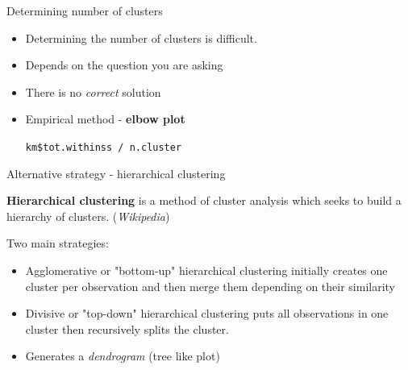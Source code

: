 \documentclass[9pt]{beamer}
\begin{document}
\begin{frame}
{Determining number of clusters}
\begin{itemize}
\item Determining the number of clusters is difficult.
\item Depends on the question you are asking
\item There is no \textit{correct} solution
\pause
\item Empirical method - \textbf{elbow plot}
\begin{codebox}
\texttt{km\$tot.withinss / n.cluster}
\end{codebox}
\end{itemize}
\end{frame}

\begin{frame}
{Alternative strategy - hierarchical clustering}

\textbf{Hierarchical clustering} is a method of cluster analysis which seeks to build a hierarchy of clusters. (\textit{Wikipedia})

Two main strategies:
\begin{itemize}
\item Agglomerative or "bottom-up" hierarchical clustering initially creates one cluster per observation and then merge them depending on their similarity
\item Divisive or "top-down" hierarchical clustering puts all observations in one cluster then recursively splits the cluster.
\item Generates a \textit{dendrogram} (tree like plot)
\end{itemize}
\end{frame}
\end{document}
